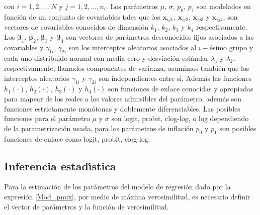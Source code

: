 
con $i=1,2,\ldots, N$ y $j=1,2,\ldots, n_i$. Los par\'{a}metros $\mu$, $\sigma$, $p_0$, $p_1$ son modelados en funci\'{o}n de un conjunto de covariables tales que los $\mathbf{x}_{ij1}$, $\mathbf{x}_{ij2}$, $\mathbf{x}_{ij3}$ y $\mathbf{x}_{ij4}$, son vectores de covariables conocidos de dimensi\'{o}n $k_1$, $k_2$, $k_3$ y $k_4$ respectivamente. Los $\boldsymbol{\beta}_1$, $\boldsymbol{\beta}_2$, $\boldsymbol{\beta}_3$ y $\boldsymbol{\beta}_4$ son vectores de par\'{a}metros desconocidos fijos asociados a las covariables y $\gamma_{1i}$, $\gamma_{2i}$ son los interceptos aleatorios asociados al $i-$\'{e}simo grupo y cada uno distribuido normal con media cero y desviaci\'{o}n est\'{a}ndar $\lambda_1$ y $\lambda_2$, respectivamente, llamados componentes de varianza, asumimos tambi\'{e}n que los interceptos aleatorios $\gamma_{1i}$ y $\gamma_{2i}$ son independientes entre s\'{\i}. Adem\'{a}s las funciones $h_1(\cdot)$, $h_2(\cdot)$, $h_3(\cdot)$ y $h_4(\cdot)$ son funciones de enlace conocidas y apropiadas para mapear de los reales a los valores admisibles del par\'{a}metro, adem\'{a}s son funciones estrictamente mon\'{o}tonas y doblemente diferenciables. Las posibles funciones para el par\'{a}metro $\mu$ y $\sigma$ son logit, probit, clog-log, o log dependiendo de la parametrizaci\'{o}n usada, para los par\'{a}metros de inflaci\'{o}n $p_0$ y $p_1$ son posibles funciones de enlace como logit, probit, clog-log.




\subsection{Inferencia estad\'{\i}stica}

Para la estimaci\'{o}n de los par\'{a}metros del modelo de regresi\'{o}n dado por la expresi\'{o}n \eqref{Mod_pmix}, por medio de m\'{a}xima verosimilitud, es necesario definir el vector de par\'{a}metros y la funci\'{o}n de verosimilitud.

